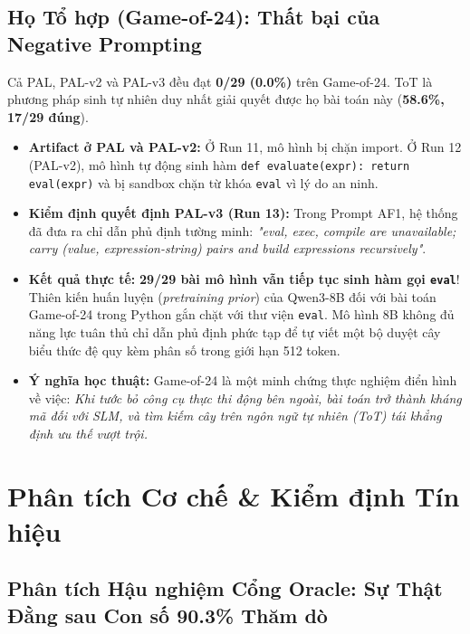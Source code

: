 \documentclass[11pt,a4paper]{report}
\begin{document}
\section{Họ Tổ hợp (Game-of-24): Thất bại của Negative Prompting}
\begin{tcolorbox}[title=Bản chất Thất bại trên Game-of-24]
Cả PAL, PAL-v2 và PAL-v3 đều đạt \textbf{0/29 (0.0\%)} trên Game-of-24. ToT là phương pháp sinh tự nhiên duy nhất giải quyết được họ bài toán này (\textbf{58.6\%, 17/29 đúng}).
\end{tcolorbox}

\begin{itemize}[leftmargin=*]
    \item \textbf{Artifact ở PAL và PAL-v2:} Ở Run 11, mô hình bị chặn import. Ở Run 12 (PAL-v2), mô hình tự động sinh hàm \texttt{def evaluate(expr): return eval(expr)} và bị sandbox chặn từ khóa \texttt{eval} vì lý do an ninh.
    \item \textbf{Kiểm định quyết định PAL-v3 (Run 13):} Trong Prompt AF1, hệ thống đã đưa ra chỉ dẫn phủ định tường minh: \textit{"eval, exec, compile are unavailable; carry (value, expression-string) pairs and build expressions recursively"}.
    \item \textbf{Kết quả thực tế:} \textbf{29/29 bài mô hình vẫn tiếp tục sinh hàm gọi \texttt{eval}}! Thiên kiến huấn luyện (\textit{pretraining prior}) của Qwen3-8B đối với bài toán Game-of-24 trong Python gắn chặt với thư viện \texttt{eval}. Mô hình 8B không đủ năng lực tuân thủ chỉ dẫn phủ định phức tạp để tự viết một bộ duyệt cây biểu thức đệ quy kèm phân số trong giới hạn 512 token.
    \item \textbf{Ý nghĩa học thuật:} Game-of-24 là một minh chứng thực nghiệm điển hình về việc: \textit{Khi tước bỏ công cụ thực thi động bên ngoài, bài toán trở thành kháng mã đối với SLM, và tìm kiếm cây trên ngôn ngữ tự nhiên (ToT) tái khẳng định ưu thế vượt trội.}
\end{itemize}

\newpage

\chapter{Phân tích Cơ chế \& Kiểm định Tín hiệu}

\section{Phân tích Hậu nghiệm Cổng Oracle: Sự Thật Đằng sau Con số 90.3\% Thăm dò}
\end{document}
